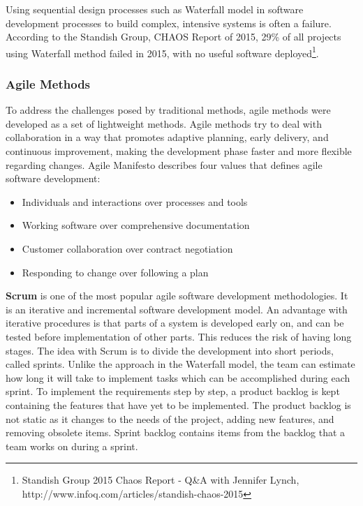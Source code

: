 Using sequential design processes such as Waterfall model in software development processes to build complex, intensive systems is often a failure\cite{p50-allman}. According to the Standish Group, CHAOS Report of 2015, 29\% of all projects using Waterfall method failed in 2015, with no useful software deployed\footnote{\label{note1}Standish Group 2015 Chaos Report - Q\&A with Jennifer Lynch, http://www.infoq.com/articles/standish-chaos-2015}. 


\subsubsection{Agile Methods}
To address the challenges posed by traditional methods, agile methods were developed as a set of lightweight methods\cite{hijazi2012review}. Agile methods try to deal with collaboration in a way that promotes adaptive planning, early delivery, and continuous improvement, making the development phase faster and more flexible regarding changes\cite{abrahamsson2002agile}. Agile Manifesto describes four values that defines agile software development\cite{agilemanifesto}: 
\begin{itemize}
	\item Individuals and interactions over processes and tools
	\item Working software over comprehensive documentation
	\item Customer collaboration over contract negotiation
	\item Responding to change over following a plan
\end{itemize}

\textbf{Scrum} is one of the most popular agile software development methodologies\cite{Vliet:2008:SEP:1481475,Pressman:2009:SEP:1593949,Sommerville:2011:SE}. It is an iterative and incremental software development model. An advantage with iterative procedures is that parts of a system is developed early on, and can be tested before implementation of other parts. This reduces the risk of having long stages\cite{washizaki2007quality}. The idea with Scrum is to divide the development into short periods, called sprints. Unlike the approach in the Waterfall model, the team can estimate how long it will take to implement tasks which can be accomplished during each sprint. To implement the requirements step by step, a product backlog is kept containing the features that have yet to be implemented. The product backlog is not static as it changes to the needs of the project, adding new features, and removing obsolete items. Sprint backlog contains items from the backlog that a team works on during a sprint.

